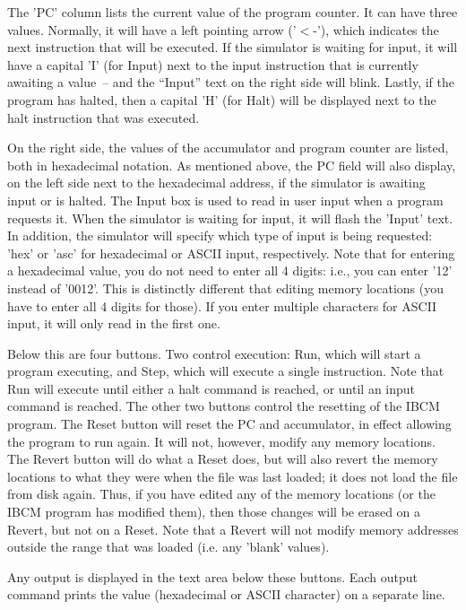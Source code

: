 The 'PC' column lists the current value of the program counter. It can
have three values. Normally, it will have a left pointing arrow
('$<$-'), which indicates the next instruction that will be executed.
If the simulator is waiting for input, it will have a capital 'I' (for
Input) next to the input instruction that is currently awaiting a
value~-- and the ``Input'' text on the right side will blink. Lastly,
if the program has halted, then a capital 'H' (for Halt) will be
displayed next to the halt instruction that was executed.

On the right side, the values of the accumulator and program counter
are listed, both in hexadecimal notation. As mentioned above, the PC
field will also display, on the left side next to the hexadecimal
address, if the simulator is awaiting input or is halted. The Input
box is used to read in user input when a program requests it. When the
simulator is waiting for input, it will flash the 'Input' text. In
addition, the simulator will specify which type of input is being
requested: 'hex' or 'asc' for hexadecimal or ASCII input,
respectively. Note that for entering a hexadecimal value, you do not
need to enter all 4 digits: i.e., you can enter '12' instead of
'0012'. This is distinctly different that editing memory locations
(you have to enter all 4 digits for those). If you enter multiple
characters for ASCII input, it will only read in the first one.

Below this are four buttons. Two control execution: Run, which will
start a program executing, and Step, which will execute a single
instruction. Note that Run will execute until either a halt command is
reached, or until an input command is reached. The other two buttons
control the resetting of the IBCM program. The Reset button will reset
the PC and accumulator, in effect allowing the program to run again.
It will not, however, modify any memory locations. The Revert button
will do what a Reset does, but will also revert the memory locations
to what they were when the file was last loaded; it does not load the
file from disk again. Thus, if you have edited any of the memory
locations (or the IBCM program has modified them), then those changes
will be erased on a Revert, but not on a Reset. Note that a Revert
will not modify memory addresses outside the range that was loaded
(i.e. any 'blank' values).

Any output is displayed in the text area below these buttons. Each
output command prints the value (hexadecimal or ASCII character) on a
separate line.

